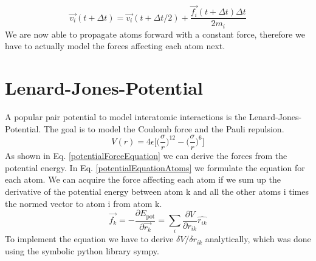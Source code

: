 \begin{equation}
	\label{verletCorrection}
	\overrightarrow{v_{i}}(t+\Delta t) = \overrightarrow{v_{i}}(t+\Delta t/2) +
	\frac{\overrightarrow{f_{i}}(t + \Delta t)\Delta t}{2m_{i}}
\end{equation}
We are now able to propagate atoms forward with a constant force, therefore we have to actually model the forces affecting each atom next.


\section{Lenard-Jones-Potential}
\begin{comment}
- pair potential
\end{comment}
A popular pair potential to model interatomic interactions is the Lenard-Jones-Potential. 
The goal is to model the Coulomb force and the Pauli repulsion. 
\begin{equation}
	V(r) = 4\epsilon\bigg[\Big(\frac{\sigma}{r}\Big)^{12}- \Big(\frac{\sigma}{r}\Big)^{6} \bigg]
\end{equation}
As shown in Eq. \ref{potentialForceEquation} we can derive the forces from the potential energy. 
In Eq. \ref {potentialEquationAtoms} we formulate the equation for each atom. 
We can acquire the force affecting each atom if we sum up the derivative of the potential energy between atom k and all the other atoms i times the normed vector to atom i from atom k. 
\begin{equation}
	\label{potentialEquationAtoms}
	\overrightarrow{f_{k}} = -\frac{\partial E_{\mathrm{pot}}}{\partial  \overrightarrow{r_{k}}} = \sum_{i}^{}\frac{\partial V}{\partial r_{ik}} \hat{r_{ik}}
\end{equation}
To implement the equation we have to derive $\delta V/ \delta r_{ik}$ analytically, which was done using the symbolic python library sympy. 

